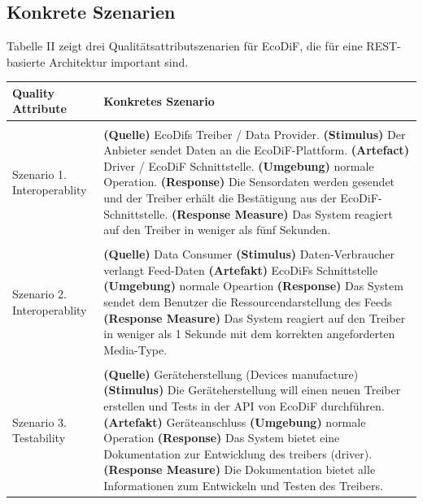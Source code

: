 \documentclass{acmsiggraph}
\begin{document}
\subsection{Konkrete Szenarien}
Tabelle II zeigt drei Qualitätsattributszenarien für EcoDiF, die für eine REST-basierte Architektur important sind.
\vspace{4px}
\begin{center}
  \label{tab:xtab}
  \begin{xtabular}{|C{2cm}|L{6cm}|} 
  \hline
    Quality Attribute & Konkretes Szenario \\
    \hline
    & \\[-2ex]
    Szenario  1.  Interoperablity &   \textbf{(Quelle)} EcoDifs Treiber / Data Provider.   \newline
\textbf{(Stimulus)} Der Anbieter sendet Daten an die EcoDiF-Plattform.  \newline
\textbf{(Artefact)} Driver / EcoDiF Schnittstelle.  \newline
\textbf{(Umgebung)} normale Operation.  \newline
\textbf{(Response)} Die Sensordaten werden gesendet und der Treiber erhält die Bestätigung aus der EcoDiF-Schnittstelle. \newline
\textbf{(Response Measure)} Das System reagiert auf den Treiber in weniger als fünf Sekunden.
   \\
    \hline
       & \\[-2ex]
     Szenario  2.  Interoperablity & 
    \textbf{(Quelle)} Data Consumer \newline
\textbf{(Stimulus)} Daten-Verbraucher verlangt Feed-Daten \newline
\textbf{(Artefakt)} EcoDiFs Schnittstelle \newline
\textbf{(Umgebung)} normale Opeartion  \newline
\textbf{(Response)} Das System sendet dem Benutzer die Ressourcendarstellung des Feeds \newline
\textbf{(Response Measure)} Das System reagiert auf den Treiber in weniger als 1 Sekunde mit dem korrekten angeforderten Media-Type.
 \\ 
     \hline 
     & \\[-2ex]
   Szenario  3.  Testability & 
\textbf{(Quelle)} Geräteherstellung (Devices manufacture)\newline
\textbf{(Stimulus)} Die Geräteherstellung will einen neuen Treiber erstellen und Tests in der API von EcoDiF durchführen. \newline
\textbf{(Artefakt)} Geräteanschluss \newline
\textbf{(Umgebung)} normale Operation \newline
\textbf{(Response)} Das System bietet eine Dokumentation zur Entwicklung des treibers (driver). \newline
\textbf{(Response Measure)} Die Dokumentation bietet alle Informationen zum Entwickeln und Testen des Treibers.    
 \\ 
       \hline 
 \end{xtabular}
 \end{center}
\end{document}
